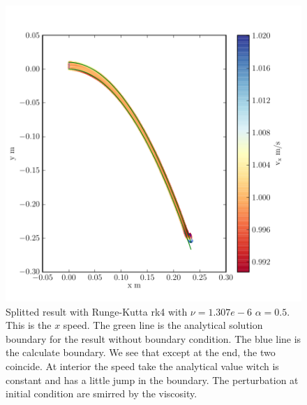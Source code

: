 \begin{figure}
	\includegraphics{topology/lateral_jet/plot_9__1_182.pdf}
		\caption{Splitted result with Runge-Kutta rk4 with $\nu=1.307e-6$ $\alpha=0.5$.
	This is the $x$ speed.
	The green line is the analytical solution boundary for the result without boundary condition.
	The blue line is the calculate boundary.
	We see that except at the end, the two coincide.
	At interior the speed take the analytical value witch is constant and has a little jump in the boundary.
	The perturbation at initial condition are smirred by the viscosity.}
	\label{topo:extrap:lateral:9_1}
\end{figure}

